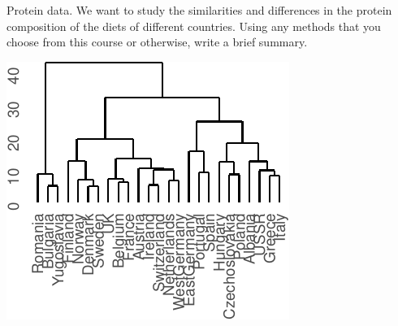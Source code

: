 \documentclass[]{article}
\newenvironment{Shaded}{\begin{snugshade}}{\end{snugshade}}
\newcommand{\DecValTok}[1]{\textcolor[rgb]{0.00,0.00,0.81}{#1}}
\newcommand{\KeywordTok}[1]{\textcolor[rgb]{0.13,0.29,0.53}{\textbf{#1}}}
\newcommand{\NormalTok}[1]{#1}
\newcommand{\OperatorTok}[1]{\textcolor[rgb]{0.81,0.36,0.00}{\textbf{#1}}}
\newcommand{\StringTok}[1]{\textcolor[rgb]{0.31,0.60,0.02}{#1}}
\begin{document}
Protein data. We want to study the similarities and differences in the
protein composition of the diets of different countries. Using any
methods that you choose from this course or otherwise, write a brief
summary.

\begin{Shaded}
\end{Shaded}

\begin{center}\includegraphics{sol_A1_files/figure-latex/unnamed-chunk-12-1} \end{center}
\end{document}
